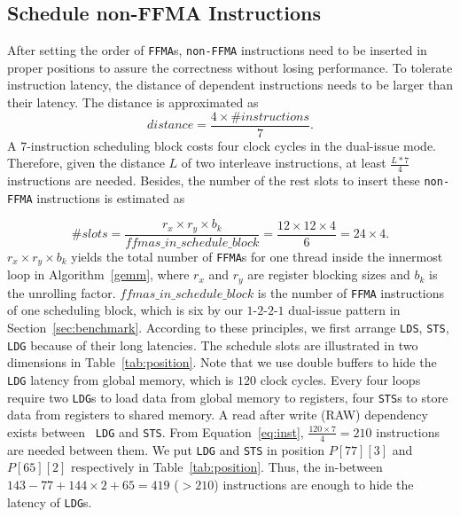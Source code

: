 \subsection{Schedule non-FFMA Instructions}
After setting the order of {\tt FFMA}s, {\tt non-FFMA} instructions need to be inserted in proper positions to
assure the correctness without losing performance. To tolerate instruction latency, the
distance of dependent instructions needs to be larger than their latency. The distance is approximated as
{\small
\begin{equation}
\label{eq:inst}
distance = \frac{4\times\#instructions}{7}.
\end{equation}
}
A $7$-instruction scheduling block costs four clock cycles in the dual-issue mode.
Therefore, given the distance $L$ of two interleave instructions, at least $\frac{L*7}{4}$ instructions are needed.
Besides, the number of the rest slots to insert these {\tt non-FFMA} instructions is estimated as

{\small
\begin{displaymath}
\#slots = \frac{r_x\times r_y\times b_k}{ffmas\_in\_schedule\_block}=\frac{12\times 12\times 4}{6}=24\times 4.
\end{displaymath}
}
$r_x\times r_y\times b_k$ yields the total number of {\tt FFMA}s for one thread inside the innermost loop in Algorithm~\ref{gemm}, where $r_x$ and $r_y$ are register blocking sizes and $b_k$ is the unrolling factor.
$ffmas\_in\_schedule\_block$ is the number of {\tt FFMA} instructions of one scheduling block, which is six by our
$1$-$2$-$2$-$1$ dual-issue pattern in Section~\ref{sec:benchmark}.
According to these principles, we first arrange {\tt LDS}, {\tt STS}, {\tt LDG} because of their long latencies. The
schedule slots are illustrated in two dimensions in Table~\ref{tab:position}.
Note that we use double buffers to hide the {\tt LDG} latency from global memory, which is $120$ clock cycles.
Every four loops require two {\tt LDG}s to load data from global memory to registers, four {\tt STS}s to store data from
registers to shared memory. A read after write (RAW) dependency exists between {\tt
LDG} and {\tt STS}.
From Equation~\ref{eq:inst}, $\frac{120\times 7}{4} = 210$ instructions are needed between them.
We put {\tt LDG} and  {\tt STS} in position $P[77][3]$ and $P[65][2]$ respectively in Table~\ref{tab:position}.
Thus, the in-between $143-77 + 144\times 2 + 65=419$ ($>210$) instructions are enough to hide the latency of {\tt LDG}s.

